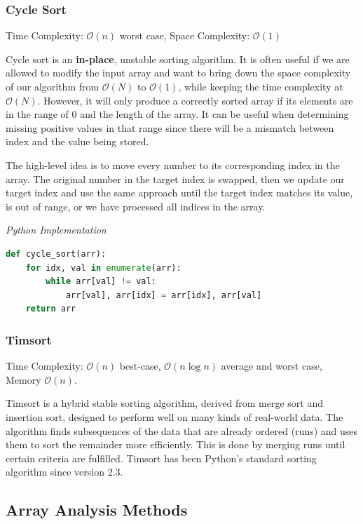 \documentclass{article}
\newcommand{\bigO}{\mathcal{O}}
\begin{document}
    \subsubsection{Cycle Sort}
    Time Complexity: $\bigO(n)$ worst case, Space Complexity: $\bigO(1)$ 
    
    Cycle sort is an \textbf{in-place}, unstable sorting algorithm. It is often useful if we are allowed to modify the input array and want to bring down the space complexity of our algorithm from $\bigO(N)$ to $\bigO(1)$, while keeping the time complexity at $\bigO(N)$. However, it will only produce a correctly sorted array if its elements are in the range of 0 and the length of the array. It can be useful when determining missing positive values in that range since there will be a mismatch between index and the value being stored.
    
    The high-level idea is to move every number to its corresponding index in the array. The original number in the target index is swapped, then we update our target index and use the same approach until the target index matches its value, is out of range, or we have processed all indices in the array.

\vspace{8pt} \emph{Python Implementation}
\begin{lstlisting}[language=Python]
def cycle_sort(arr): 
    for idx, val in enumerate(arr):                       
        while arr[val] != val: 
            arr[val], arr[idx] = arr[idx], arr[val]  
    return arr
\end{lstlisting}

    \subsubsection{Timsort}
    Time Complexity: $\bigO(n)$ best-case, $\bigO(n\log n)$  average and worst case, Memory $\bigO(n)$.
    
    Timsort is a hybrid stable sorting algorithm, derived from merge sort and insertion sort, designed to perform well on many kinds of real-world data. The algorithm finds subsequences of the data that are already ordered (runs) and uses them to sort the remainder more efficiently. This is done by merging runs until certain criteria are fulfilled. Timsort has been Python's standard sorting algorithm since version 2.3.
    
    \subsection{Array Analysis Methods}
    
\end{document}
